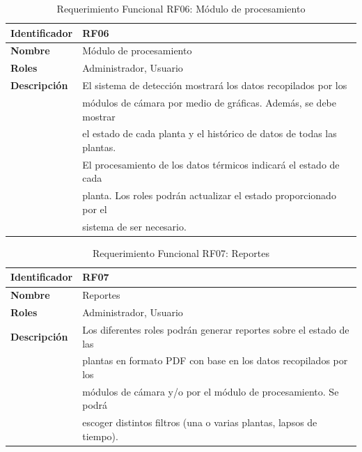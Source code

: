   \begin{table}[H]
	\centering
	\caption{Requerimiento Funcional RF06: Módulo de procesamiento}
	\label{tab:rf06}
	\begin{tabular}{@{}ll@{}} 
	  \toprule
	  \textbf{Identificador} & RF06 \\
	  \midrule
	  \textbf{Nombre} & Módulo de procesamiento \\
	  \textbf{Roles} & Administrador, Usuario \\
	  \textbf{Descripción} & El sistema de detección mostrará los datos recopilados por los \\
						   & módulos de cámara por medio de gráficas. Además, se debe mostrar \\
						   & el estado de cada planta y el histórico de datos de todas las plantas. \\
						   & El procesamiento de los datos térmicos indicará el estado de cada \\
						   & planta. Los roles podrán actualizar el estado proporcionado por el \\
						   & sistema de ser necesario. \\
	  \bottomrule
	\end{tabular}
  \end{table}
  
  \begin{table}[H]
	\centering
	\caption{Requerimiento Funcional RF07: Reportes}
	\label{tab:rf07}
	\begin{tabular}{@{}ll@{}} 
	  \toprule
	  \textbf{Identificador} & RF07 \\
	  \midrule
	  \textbf{Nombre} & Reportes \\
	  \textbf{Roles} & Administrador, Usuario \\
	  \textbf{Descripción} & Los diferentes roles podrán generar reportes sobre el estado de las \\
						   & plantas en formato PDF con base en los datos recopilados por los \\
						   & módulos de cámara y/o por el módulo de procesamiento. Se podrá \\
						   & escoger distintos filtros (una o varias plantas, lapsos de tiempo). \\
	  \bottomrule
	\end{tabular}
  \end{table}
  
